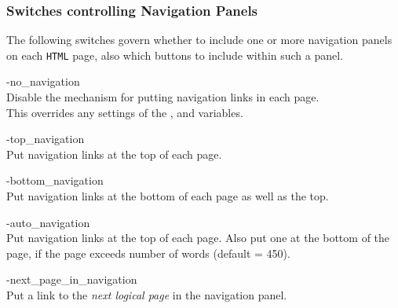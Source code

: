\subsubsection{Switches controlling Navigation Panels\label{navoptions}}
%
The following switches govern whether to include one or more navigation
panels on each \texttt{HTML} page, 
also which buttons to include within such a panel.

\begin{htmllist}%

\item [ -no\_navigation\label{nonavig}]
\\
Disable the mechanism for putting navigation links in each page.\\
This overrides any settings of the ,
 and  variables.

\item [ -top\_navigation\label{topnavig}]
\\
Put navigation links at the top of each page.    

%
\item [ -bottom\_navigation\label{botnavig}]
\\
Put navigation links at the bottom of each page as well as the top.

\item [ -auto\_navigation\label{autonavig}]
\\
Put navigation links at the top of each page. 
Also put one at the bottom of the page, if the page exceeds 
 number of words (default = 450).

\item [ -next\_page\_in\_navigation\label{nextinnavig}]
\\
Put a link to the \textsl{next logical page} in the navigation panel.


\end{htmllist}
